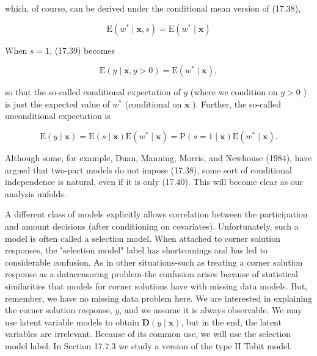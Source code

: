 \documentclass[10pt]{article}
\begin{document}
which, of course, can be derived under the conditional mean version of (17.38),


\begin{equation*}
\mathrm{E}\left(w^{*} \mid \mathbf{x}, s\right)=\mathrm{E}\left(w^{*} \mid \mathbf{x}\right) \tag{17.40}
\end{equation*}


When $s=1$, (17.39) becomes


\begin{equation*}
\mathrm{E}(y \mid \mathbf{x}, y>0)=\mathrm{E}\left(w^{*} \mid \mathbf{x}\right), \tag{17.41}
\end{equation*}


so that the so-called conditional expectation of $y$ (where we condition on $y>0$ ) is just the expected value of $w^{*}$ (conditional on $\mathbf{x}$ ). Further, the so-called unconditional expectation is


\begin{equation*}
\mathrm{E}(y \mid \mathbf{x})=\mathrm{E}(s \mid \mathbf{x}) \mathrm{E}\left(w^{*} \mid \mathbf{x}\right)=\mathrm{P}(s=1 \mid \mathbf{x}) \mathrm{E}\left(w^{*} \mid \mathbf{x}\right) . \tag{17.42}
\end{equation*}


Although some, for example, Duan, Manning, Morris, and Newhouse (1984), have argued that two-part models do not impose (17.38), some sort of conditional independence is natural, even if it is only (17.40). This will become clear as our analysis unfolds.

A different class of models explicitly allows correlation between the participation and amount decisions (after conditioning on covariates). Unfortunately, such a model is often called a selection model. When attached to corner solution responses, the "selection model" label has shortcomings and has led to considerable confusion. As in other situations-such as treating a corner solution response as a datacensoring problem-the confusion arises because of statistical similarities that models for corner solutions have with missing data models. But, remember, we have no missing data problem here. We are interested in explaining the corner solution response, $y$, and we assume it is always observable. We may use latent variable models to obtain $\mathbf{D}(y \mid \mathbf{x})$, but in the end, the latent variables are irrelevant. Because of its common use, we will use the selection model label. In Section 17.7.3 we study a version of the type II Tobit model.
\end{document}
